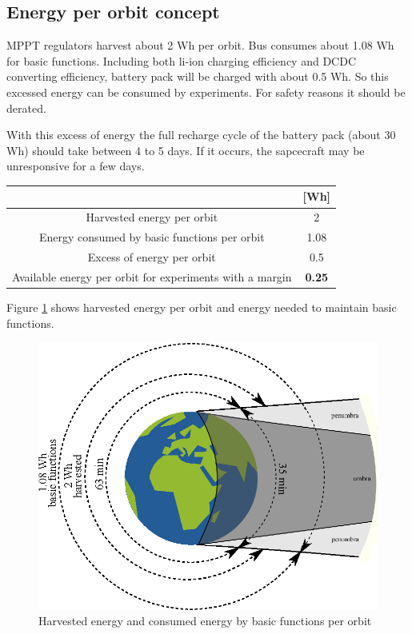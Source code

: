 \subsection{Energy per orbit concept}
MPPT regulators harvest about 2 Wh per orbit. Bus consumes about 1.08 Wh for basic functions. Including both li-ion charging efficiency and DCDC converting efficiency, battery pack will be charged with about 0.5 Wh. So this excessed energy can be consumed by experiments. For safety reasons it should be derated.

With this excess of energy the full recharge cycle of the battery pack (about 30 Wh) should take between 4 to 5 days. If it occurs, the sapcecraft may be unresponsive for a few days.

\begin{center}
	\begin{tabular}{c|c}
		&[Wh] \\ \hline
		Harvested energy per orbit & 2 \\ \hline
		Energy consumed by basic functions per orbit & 1.08 \\ \hline
		Excess of energy per orbit & 0.5 \\ \hline
		Available energy per orbit for experiments with a margin & \textbf{0.25}
	\end{tabular}
\end{center}

Figure \ref{fig:pwr:energy} shows harvested energy per orbit and energy needed to maintain basic functions.

\begin{figure}[ht]
	\begin{center}
		\includegraphics{img/power-budget-energy}
		\caption{Harvested energy and consumed energy by basic functions per orbit}
		\label{fig:pwr:energy}
	\end{center}
\end{figure}

